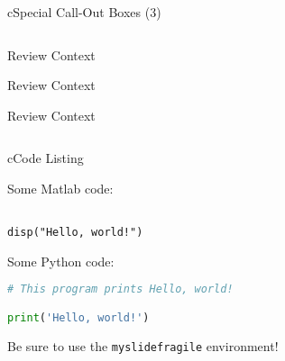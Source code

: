 \begin{myslide}{c}{Special Call-Out Boxes (3)}

\begin{columns}

\begin{column}{1\textwidth}

\begin{itemize}

\begin{myoptional}
\lipsum[1][1-6]
\end{myoptional}

\begin{myreview}{Review Context}
\lipsum[2][1-3]
\end{myreview}

\begin{itemize}

\begin{myreview}{Review Context}
\lipsum[2][1-3]
\end{myreview}

\begin{itemize}

\begin{myreview}{Review Context}
\lipsum[2][1-3]
\end{myreview}

\end{itemize}

\end{itemize}

\end{itemize}

\end{column}

\end{columns}

\end{myslide}

\begin{myslidefragile}{c}{Code Listing}

Some Matlab code:
\begin{lstlisting}[xleftmargin=0pt]
% This program prints Hello, world!

disp("Hello, world!")
\end{lstlisting}

Some Python code:
\begin{lstlisting}[xleftmargin=0pt,language=Python]
# This program prints Hello, world!

print('Hello, world!')
\end{lstlisting}

Be sure to use the \lstinline{myslidefragile} environment!

\end{myslidefragile}